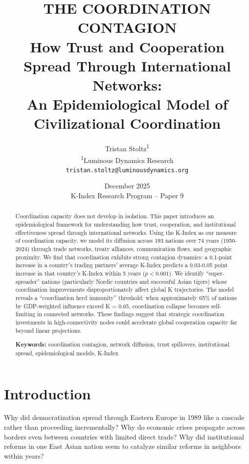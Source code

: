 \documentclass[12pt,a4paper]{article}
\title{\textbf{THE COORDINATION CONTAGION}\\[0.5cm]
\Large How Trust and Cooperation Spread Through International Networks:\\
An Epidemiological Model of Civilizational Coordination}
\author{Tristan Stoltz\textsuperscript{1}\\[0.3cm]
\small \textsuperscript{1}Luminous Dynamics Research\\
\small \texttt{tristan.stoltz@luminousdynamics.org}}
\date{December 2025\\[0.3cm]
\small K-Index Research Program -- Paper 9}
\begin{document}
\maketitle

\begin{abstract}
Coordination capacity does not develop in isolation. This paper introduces an epidemiological framework for understanding how trust, cooperation, and institutional effectiveness spread through international networks. Using the K-Index as our measure of coordination capacity, we model its diffusion across 193 nations over 74 years (1950-2024) through trade networks, treaty alliances, communication flows, and geographic proximity. We find that coordination exhibits strong contagion dynamics: a 0.1-point increase in a country's trading partners' average K-Index predicts a 0.03-0.05 point increase in that country's K-Index within 5 years ($p < 0.001$). We identify ``super-spreader'' nations (particularly Nordic countries and successful Asian tigers) whose coordination improvements disproportionately affect global K trajectories. The model reveals a ``coordination herd immunity'' threshold: when approximately 65\% of nations by GDP-weighted influence exceed K = 0.65, coordination collapse becomes self-limiting in connected networks. These findings suggest that strategic coordination investments in high-connectivity nodes could accelerate global cooperation capacity far beyond linear projections.

\vspace{0.5cm}
\noindent\textbf{Keywords:} coordination contagion, network diffusion, trust spillovers, institutional spread, epidemiological models, K-Index
\end{abstract}

\newpage
\tableofcontents
\newpage

\section{Introduction}
\label{sec:intro}

Why did democratization spread through Eastern Europe in 1989 like a cascade rather than proceeding incrementally? Why do economic crises propagate across borders even between countries with limited direct trade? Why did institutional reforms in one East Asian nation seem to catalyze similar reforms in neighbors within years?
\end{document}
